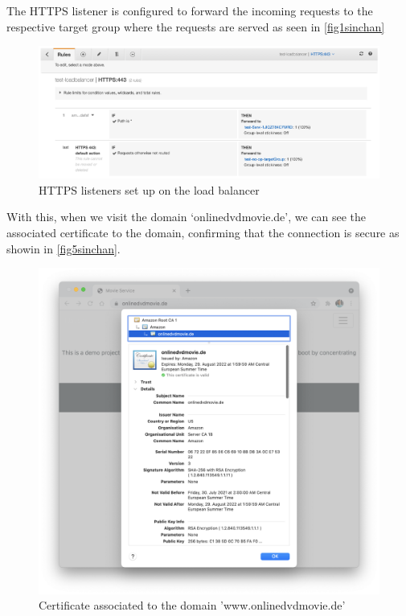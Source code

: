 The HTTPS listener is configured to forward the incoming requests to the respective target group where the requests are served as seen in \autoref{fig1sinchan}

\begin{figure}[h]
\centerline{\includegraphics[scale=.36]{images/Sinchan/1sinchan.png}}
\caption{HTTPS listeners set up on the load balancer}
\label{fig1sinchan}
\end{figure}

With this, when we visit the domain ‘onlinedvdmovie.de’, we can see the associated certificate to the domain, confirming that the connection is secure as showin in \autoref{fig5sinchan}.

\begin{figure}[h]
\centerline{\includegraphics[scale=.36]{images/Sinchan/5sinchan.png}}
\caption{Certificate associated to the domain 'www.onlinedvdmovie.de'}
\label{fig5sinchan}
\end{figure}

